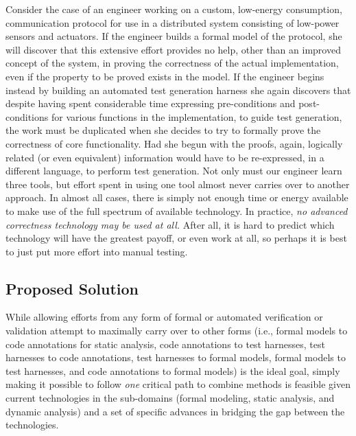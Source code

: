 Consider the case of an engineer working on a custom, low-energy consumption, communication protocol for use in a distributed system consisting of low-power sensors and actuators.  If the engineer builds a formal model of the protocol, she will discover that this extensive effort provides no help, other than an improved concept of the system, in proving the correctness of the actual implementation, even if the property to be proved exists in the model.  If the engineer begins instead by building an automated test generation harness she again discovers that despite having spent considerable time expressing pre-conditions and post-conditions for various functions in the implementation, to guide test generation, the work must be duplicated when she decides to try to formally prove the correctness of core functionality.  Had she begun with the proofs, again, logically related (or even equivalent) information would have to be re-expressed, in a different language, to perform test generation.  Not only must our engineer learn three tools, but effort spent in using one tool almost never carries over to another approach.  In almost all cases, there is simply not enough time or energy available to make use of the full spectrum of available technology.  In practice, \emph{no advanced correctness technology may be used at all.}  After all, it is hard to predict which technology will have the greatest payoff, or even work at all, so perhaps it is best to just put more effort into manual testing.

\subsection{Proposed Solution}

While allowing efforts from any form of formal or automated verification or validation attempt to maximally carry over to other forms (i.e., formal models to code annotations for static analysis, code annotations to test harnesses, test harnesses to code annotations, test harnesses to formal models, formal models to test harnesses, and code annotations to formal models) is the ideal goal, simply making it possible to follow \emph{one} critical path to combine methods is feasible given current technologies in the sub-domains (formal modeling, static analysis, and dynamic analysis) and a set of specific advances in bridging the gap between the technologies.

